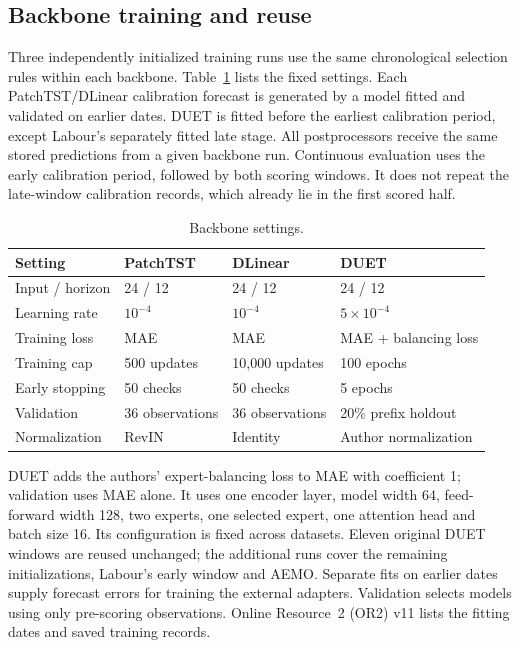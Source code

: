\FloatBarrier
\subsection{Backbone training and reuse}\label{sec:training}
Three independently initialized training runs use the same chronological
selection rules within each backbone. Table~\ref{tab:backbone_settings}
lists the fixed settings. Each PatchTST/DLinear calibration forecast is generated by a model
fitted and validated on earlier dates. DUET is fitted
before the earliest calibration period, except Labour's separately fitted
late stage. All postprocessors receive the same stored predictions from a given
backbone run. Continuous evaluation uses the early calibration period,
followed by both scoring windows. It does not repeat the late-window
calibration records, which already lie in the first scored half.

\begin{table}[htbp]\centering\footnotesize
\caption{Backbone settings.}\label{tab:backbone_settings}
\setlength{\tabcolsep}{3pt}
\begin{tabular}{llll}\toprule
Setting & PatchTST & DLinear & DUET\\
\midrule
Input / horizon & 24 / 12 & 24 / 12 & 24 / 12\\
Learning rate & $10^{-4}$ & $10^{-4}$ & $5\times10^{-4}$\\
Training loss & MAE & MAE & MAE + balancing loss\\
Training cap & 500 updates & 10,000 updates & 100 epochs\\
Early stopping & 50 checks & 50 checks & 5 epochs\\
Validation & 36 observations & 36 observations & 20\% prefix holdout\\
Normalization & RevIN & Identity & Author normalization\\
\bottomrule\end{tabular}
\end{table}
DUET adds the authors' expert-balancing loss to MAE with coefficient 1;
validation uses MAE alone. It uses one encoder layer, model width 64, feed-forward width 128,
two experts, one selected expert, one attention head and batch size 16.
Its configuration is fixed across datasets. Eleven original DUET windows are reused unchanged; the additional runs
cover the remaining initializations, Labour's early window and AEMO.
Separate fits on earlier dates supply forecast errors for training the
external adapters. Validation selects models using only pre-scoring
observations. Online Resource~2 (OR2) v11 lists the fitting dates and saved
training records.

